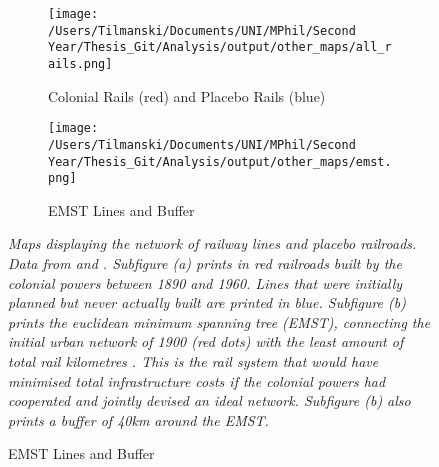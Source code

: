 \documentclass[11pt, oneside]{article}   	%
\newcommand{\mysubcaption}[1]{
\justify
\begin{spacing}{0.7}
\textit{\footnotesize #1}
\end{spacing}}
\begin{document}
\begin{figure}
\centering
\caption{Colonial Railway Network}

\begin{subfigure}[c]{0.48\textwidth}
\texttt{[image: /Users/Tilmanski/Documents/UNI/MPhil/Second Year/Thesis\_Git/Analysis/output/other\_maps/all\_rails.png]}
\caption{Colonial Rails (red) and Placebo Rails (blue)}
\label{fig:Railroad_Map}
\end{subfigure}
\begin{subfigure}[c]{0.48\textwidth}
\texttt{[image: /Users/Tilmanski/Documents/UNI/MPhil/Second Year/Thesis\_Git/Analysis/output/other\_maps/emst.png]}
\caption{EMST Lines and Buffer}
\label{fig:EMST_Map}
\end{subfigure}

\label{fig:Rail Maps}
\mysubcaption{Maps displaying the network of railway lines and placebo railroads. Data from \cite{jedwab_permanent_2016} and \cite{Herranz-Loncan_publicbenefitRailways_2017}. Subfigure (a) prints in red  railroads built by the colonial powers between 1890 and 1960. Lines that were initially planned but never actually built are printed in blue. Subfigure (b) prints the euclidean minimum spanning tree (EMST), connecting the initial urban network of 1900 (red dots) with the least amount of total rail kilometres \citep[see ][]{jedwab_permanent_2016}. This is the rail system that would have minimised total infrastructure costs if the colonial powers had cooperated and jointly devised an ideal network. Subfigure (b) also prints a buffer of 40km around the EMST.}
\end{figure}
\end{document}
